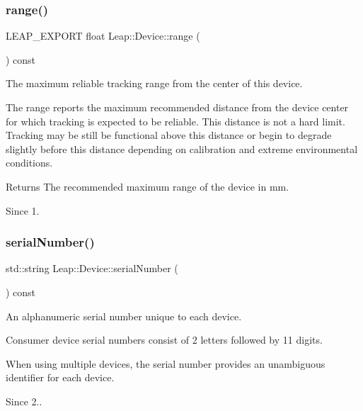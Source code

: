 \subsubsection{\texorpdfstring{range()}{range()}}
{\footnotesize\ttfamily L\+E\+A\+P\+\_\+\+E\+X\+P\+O\+RT float Leap\+::\+Device\+::range (\begin{DoxyParamCaption}{ }\end{DoxyParamCaption}) const}

The maximum reliable tracking range from the center of this device.

The range reports the maximum recommended distance from the device center for which tracking is expected to be reliable. This distance is not a hard limit. Tracking may be still be functional above this distance or begin to degrade slightly before this distance depending on calibration and extreme environmental conditions.


\begin{DoxyCodeInclude}
\end{DoxyCodeInclude}


\begin{DoxyReturn}{Returns}
The recommended maximum range of the device in mm. 
\end{DoxyReturn}
\begin{DoxySince}{Since}
1. 
\end{DoxySince}
\mbox{\label{class_leap_1_1_device_a8a9cf315850c0d54fdc31748fdad6444}} 
\subsubsection{\texorpdfstring{serial\+Number()}{serialNumber()}}
{\footnotesize\ttfamily std\+::string Leap\+::\+Device\+::serial\+Number (\begin{DoxyParamCaption}{ }\end{DoxyParamCaption}) const\hspace{0.3cm}{\ttfamily [inline]}}

An alphanumeric serial number unique to each device.

Consumer device serial numbers consist of 2 letters followed by 11 digits.

When using multiple devices, the serial number provides an unambiguous identifier for each device. \begin{DoxySince}{Since}
2.. 
\end{DoxySince}
\mbox{\label{class_leap_1_1_device_adf422b605542a30dba4400d4ec8e4890}} 
